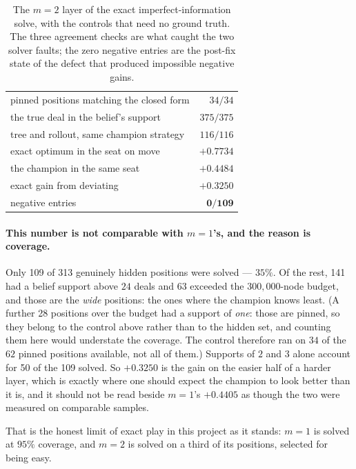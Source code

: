 \documentclass[11pt,letterpaper]{article}
\begin{document}
\begin{table}[t]
\centering
\begin{tabular}{lr}
\toprule
pinned positions matching the closed form & $34/34$ \\
the true deal in the belief's support & $375/375$ \\
tree and rollout, same champion strategy & $116/116$ \\
\midrule
exact optimum in the seat on move & $+0.7734$ \\
the champion in the same seat & $+0.4484$ \\
\midrule
exact gain from deviating & $\mathbf{+0.3250}$ \\
negative entries & $\mathbf{0/109}$ \\
\bottomrule
\end{tabular}
\caption{The $m = 2$ layer of the exact imperfect-information solve, with the controls that need no ground truth. The three agreement checks are what caught the two solver faults; the zero negative entries are the post-fix state of the defect that produced impossible negative gains.}
\label{tab:m2}
\end{table}

\paragraph{This number is not comparable with $m = 1$'s, and the reason is
coverage.} Only 109 of 313 genuinely hidden positions were solved ---
$35\%$. Of the rest, 141 had a belief support above $24$ deals and 63 exceeded
the $300{,}000$-node budget, and those are the \emph{wide} positions: the ones
where the champion knows least. (A further 28 positions over the budget had a
support of \emph{one}: those are pinned, so they belong to the control above
rather than to the hidden set, and counting them here would
understate the coverage. The control therefore ran
on $34$ of the $62$ pinned positions available, not all of them.) Supports of $2$ and $3$ alone account for
50 of the 109 solved. So $+0.3250$ is the gain on the easier half of a harder
layer, which is exactly where one should expect the champion to look better
than it is, and it should not be read beside $m = 1$'s $+0.4405$ as though the
two were measured on comparable samples.

That is the honest limit of exact play in this project as it stands: $m = 1$ is
solved at $95\%$ coverage, and $m = 2$ is solved on a third of its positions,
selected for being easy.
\end{document}
